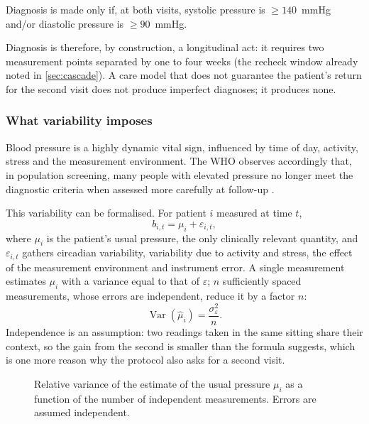 \documentclass[12pt,a4paper,oneside]{report}
\begin{document}
Diagnosis is made only if, at both visits, systolic pressure is $\geq 140$~mmHg and/or diastolic pressure is $\geq 90$~mmHg.

Diagnosis is therefore, by construction, a longitudinal act: it requires two measurement points separated by one to four weeks (the recheck window already noted in \cref{sec:cascade}). A care model that does not guarantee the patient's return for the second visit does not produce imperfect diagnoses; it produces none.

\subsubsection{What variability imposes}\label{sec:variability}

Blood pressure is a highly dynamic vital sign, influenced by time of day, activity, stress and the measurement environment. The WHO observes accordingly that, in population screening, many people with elevated pressure no longer meet the diagnostic criteria when assessed more carefully at follow-up \parencite{who2023hypertension}.

This variability can be formalised. For patient $i$ measured at time $t$,
\begin{equation}
  b_{i,t} = \mu_i + \varepsilon_{i,t},
\end{equation}
where $\mu_i$ is the patient's usual pressure, the only clinically relevant quantity, and $\varepsilon_{i,t}$ gathers circadian variability, variability due to activity and stress, the effect of the measurement environment and instrument error. A single measurement estimates $\mu_i$ with a variance equal to that of $\varepsilon$; $n$ sufficiently spaced measurements, whose errors are independent, reduce it by a factor $n$:
\begin{equation}
  \operatorname{Var}(\hat\mu_i) = \frac{\sigma_\varepsilon^2}{n}.
\end{equation}
Independence is an assumption: two readings taken in the same sitting share their context, so the gain from the second is smaller than the formula suggests, which is one more reason why the protocol also asks for a second visit.

\begin{figure}[htbp]
\centering
{}
\caption{Relative variance of the estimate of the usual pressure $\mu_i$ as a function of the number of independent measurements. Errors are assumed independent.}\label{fig:variance}
\end{figure}
\end{document}
